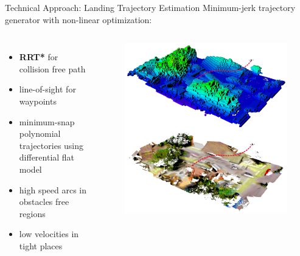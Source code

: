 \documentclass[10pt]{beamer}
\begin{document}
    \begin{frame}{Technical Approach: Landing Trajectory Estimation}
        Minimum-jerk trajectory generator with non-linear optimization:
        \begin{columns}[c,onlytextwidth]
                \justifying
                \begin{itemize}
                    \item \textbf{RRT*} for collision free path
                    \item line-of-sight for waypoints
                    \item minimum-snap polynomial trajectories using
                        differential flat model
                    \item high speed arcs in obstacles free regions
                    \item low velocities in tight places
                \end{itemize}
                \begin{figure}
                    \includegraphics[width=\textwidth]{images/Fig4.png}
                \end{figure}
        \end{columns}
    \end{frame}
\end{document}

